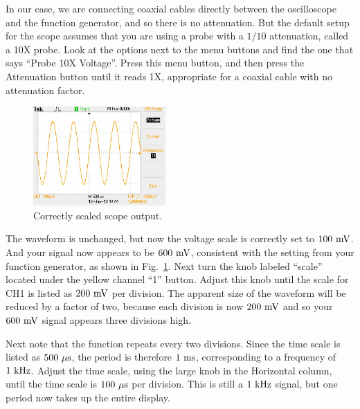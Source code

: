 In our case, we are connecting coaxial cables directly between the
oscilloscope and the function generator, and so there is no
attenuation.  But the default setup for the scope assumes that you are
using a probe with a $1/10$ attenuation, called a 10X probe.  Look at
the options next to the menu buttons and find the one that says
``Probe 10X Voltage''.  Press this menu button, and then press the
Attenuation button until it reads 1X, appropriate for a coaxial cable
with no attenuation factor.
\begin{figure}[htbp]
\begin{center}
\includegraphics[width=0.45\textwidth]{figs/labs/lissajous/sine.jpg} 
\caption{Correctly scaled scope output.}
\label{fig:scopesine}
\end{center}
\end{figure}
The waveform is unchanged, but now the voltage scale is correctly set
to $100~\rm mV$.  And your signal now appears to be $600~\rm mV$,
consistent with the setting from your function generator, as shown in
Fig.~\ref{fig:scopesine}.  Next turn the knob labeled ``scale'' located
under the yellow channel ``1'' button.  Adjust this knob until the
scale for CH1 is listed as $200~\rm mV$ per division.  The apparent
size of the waveform will be reduced by a factor of two, because each
division is now $200~\rm mV$ and so your $600~\rm mV$ signal appears
three divisions high.

Next note that the function repeats every two divisions.  Since the
time scale is listed as $500~\rm \mu s$, the period is therefore $1~\rm
ms$, corresponding to a frequency of $1~\rm kHz$.  Adjust the time
scale, using the large knob in the Horizontal column, until the time
scale is $100~\rm \mu s$ per division.  This is still a $1~\rm kHz$
signal, but one period now takes up the entire display.

